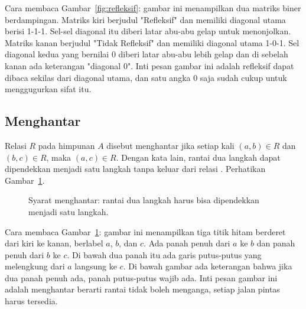 \documentclass[11pt,a4paper]{article}
\begin{document}
Cara membaca Gambar~\ref{fig:refleksif}: gambar ini menampilkan dua matriks biner berdampingan. Matriks kiri berjudul "Refleksif" dan memiliki diagonal utama berisi 1-1-1. Sel-sel diagonal itu diberi latar abu-abu gelap untuk menonjolkan. Matriks kanan berjudul "Tidak Refleksif" dan memiliki diagonal utama 1-0-1. Sel diagonal kedua yang bernilai 0 diberi latar abu-abu lebih gelap dan di sebelah kanan ada keterangan "diagonal 0". Inti pesan gambar ini adalah refleksif dapat dibaca sekilas dari diagonal utama, dan satu angka 0 saja sudah cukup untuk menggugurkan sifat itu.

\subsection{Menghantar}

Relasi $R$ pada himpunan $A$ disebut menghantar jika setiap kali $(a,b) \in R$ dan $(b,c) \in R$, maka $(a,c) \in R$. Dengan kata lain, rantai dua langkah dapat dipendekkan menjadi satu langkah tanpa keluar dari relasi \cite{rosen}. Perhatikan Gambar~\ref{fig:menghantar}.

\begin{figure}[H]
	\centering
	\caption{Syarat menghantar: rantai dua langkah harus bisa dipendekkan menjadi satu langkah.}
	\label{fig:menghantar}
\end{figure}

Cara membaca Gambar~\ref{fig:menghantar}: gambar ini menampilkan tiga titik hitam berderet dari kiri ke kanan, berlabel $a$, $b$, dan $c$. Ada panah penuh dari $a$ ke $b$ dan panah penuh dari $b$ ke $c$. Di bawah dua panah itu ada garis putus-putus yang melengkung dari $a$ langsung ke $c$. Di bawah gambar ada keterangan bahwa jika dua panah penuh ada, panah putus-putus wajib ada. Inti pesan gambar ini adalah menghantar berarti rantai tidak boleh menganga, setiap jalan pintas harus tersedia.
\end{document}
